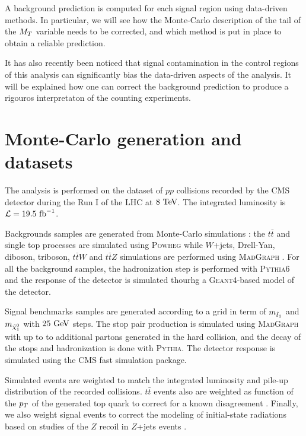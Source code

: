     A background prediction is computed for each signal region using data-driven methods.
    In particular, we will see how the Monte-Carlo description of the tail of the $M_T$ 
    variable needs to be corrected, and which method is put in place to obtain a reliable 
    prediction.

    It has also recently been noticed that signal contamination in the control regions of
    this analysis can significantly bias the data-driven aspects of the analysis. It will
    be explained how one can correct the background prediction to produce a rigouros
    interpretaton of the counting experiments.


    \section{Monte-Carlo generation and datasets}
    
    The analysis is performed on the dataset of $pp$ collisions recorded by the CMS detector
    during the Run I of the LHC at $8~\text{TeV}$. The integrated luminosity is $\mathcal{L} =
    19.5~\text{fb}^{-1}$.

    Backgrounds samples are generated from Monte-Carlo simulations : the $t\bar{t}$ and 
    single top processes are simulated using \textsc{Powheg} \cite{Powheg} while $W$+jets,
    Drell-Yan, diboson, triboson, $t\bar{t}W$ and $t\bar{t}Z$ simulations are performed 
    using \textsc{MadGraph} \cite{Madgraph}. For all the background samples, the 
    hadronization step is performed with \textsc{Pythia}6 \cite{Pythia} and the response of
    the detector is simulated thourhg a \textsc{Geant4}-based model of the detector.
    
    Signal benchmarks samples are generated according to a grid in term of $m_{\tilde{t}_1}$
    and $m_{\tilde{\chi}_1^0}$ with $25~\text{GeV}$ steps. The stop pair production is simulated
    using \textsc{MadGraph} with up to to additional partons generated in the hard collision,
    and the decay of the stops and hadronization is done with \textsc{Pythia}. The detector
    response is simulated using the CMS fast simulation package. 

    Simulated events are weighted to match the integrated luminosity and pile-up distribution
    of the recorded collisions. $t\bar{t}$ events also are weighted as function of the $p_T$ of 
    the generated top quark to correct for a known disagreement . Finally, we also
    weight signal events to correct the modeling of initial-state radiations based on studies
    of the $Z$ recoil in $Z$+jets events \cite{ISRmodelingDominick}.

